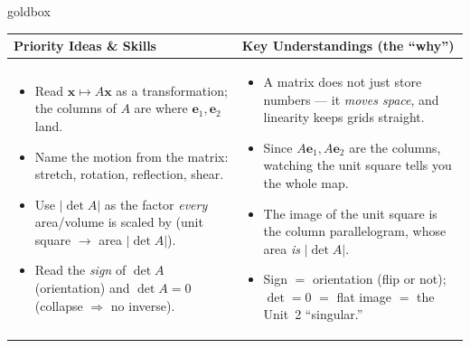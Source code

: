 \documentclass[10pt]{article}
\newcommand{\xx}{\mathbf{x}}
\newcommand{\ee}{\mathbf{e}}
\begin{document}
\renewcommand{\arraystretch}{1.4}
\begin{skillbox}{goldbox}
\begin{tabularx}{\linewidth}{@{}X|X@{}}
\textbf{Priority Ideas \& Skills} & \textbf{Key Understandings (the ``why'')} \\[2pt]
\hline
\vspace{-6pt}
\begin{itemize}[leftmargin=1.1em, nosep, after=\vspace{2pt}]
  \item Read $\xx\mapsto A\xx$ as a transformation; the columns of $A$ are where $\ee_1,\ee_2$ land.
  \item Name the motion from the matrix: stretch, rotation, reflection, shear.
  \item Use $|\det A|$ as the factor \emph{every} area/volume is scaled by (unit square $\to$ area $|\det A|$).
  \item Read the \emph{sign} of $\det A$ (orientation) and $\det A=0$ (collapse $\Rightarrow$ no inverse).
\end{itemize}
&
\vspace{-6pt}
\begin{itemize}[leftmargin=1.1em, nosep, after=\vspace{2pt}]
  \item A matrix does not just store numbers --- it \emph{moves space}, and linearity keeps grids straight.
  \item Since $A\ee_1,A\ee_2$ are the columns, watching the unit square tells you the whole map.
  \item The image of the unit square is the column parallelogram, whose area \emph{is} $|\det A|$.
  \item Sign $=$ orientation (flip or not); $\det=0$ $=$ flat image $=$ the Unit~2 ``singular.''
\end{itemize}
\end{tabularx}
\end{skillbox}
\end{document}
